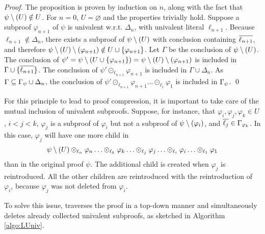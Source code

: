 \documentclass{llncs}
\begin{document}
\begin{proof}
The proposition is proven by induction on $n$, along with the fact that $\psi \setminus (U) \notin U$.
For $n = 0$, $U = \varnothing$ and the properties trivially hold. Suppose a subproof
$\varphi_{n+1}$ of $\psi$ is univalent w.r.t. $\Delta_n$, with univalent literal $\ell_{n+1}$.
Because $\ell_{n+1} \notin \Delta_n$, there exists a subproof of $\psi \setminus (U)$ with conclusion
containing $\overline{\ell_{n+1}}$, and therefore $\psi \setminus (U) \setminus (\varphi_{n+1}) \notin U \cup
\{\varphi_{n+1}\}$.  Let $\Gamma$ be the conclusion of $\psi \setminus (U)$. The conclusion of $ \psi' =
\psi \setminus (U \cup \{\varphi_{n+1}\}) = \psi \setminus (U) \setminus (\varphi_{n+1}) $ is included in $\Gamma \cup
\{\overline{\ell_{n+1}}\}$. The conclusion of $\psi' \odot_{\ell_{n+1}} \varphi_{n+1}$ is included in
$\Gamma \cup \Delta_n$. As $\Gamma \subseteq \Gamma_{\psi} \cup \Delta_n$, the conclusion of
$\psi' \odot_{\ell_{n+1}} \varphi_{n+1} \ldots \odot_{\ell_1} \varphi_1$ is included in
$\Gamma_{\psi}$. \qed
\end{proof}

For this principle to lead to proof compression, it is important to take care
of the mutual inclusion of univalent subproofs.
Suppose, for instance, that $\varphi_i, \varphi_j, \varphi_k \in U$, $i < j < k$, $\varphi_j$ is a
subproof of $\varphi_i$ but not a subproof of $\psi \setminus (\varphi_i)$, and $\overline{\ell_j} \in
\Gamma_{\varphi_k}$.  In this case, $\varphi_j$ will have one more child in
$$
\psi \setminus (U) \odot_{\ell_n} \varphi_n \ldots \odot_{\ell_k} \varphi_k \ldots \odot_{\ell_j} \varphi_j \ldots \odot_{\ell_i} \varphi_i \ldots \odot_{\ell_1} \varphi_1
$$
than in the original proof $\psi$. The additional child is created when $\varphi_j$ is reintroduced.
All the other children are reintroduced with the reintroduction of $\varphi_i$, because
$\varphi_j$ was not deleted from $\varphi_i$.

To solve this issue, {\LowerUnivalents} traverses the proof in a top-down manner and simultaneously
deletes already collected univalent subproofs, as sketched in Algorithm \ref{algo:LUniv}.  
\end{document}

